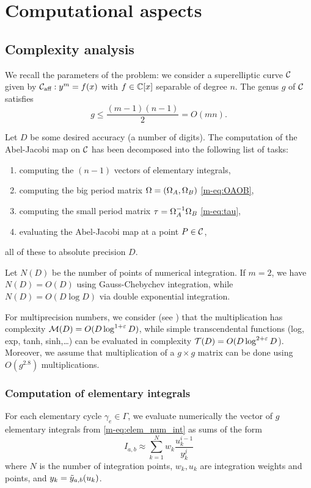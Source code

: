 \documentclass[main.tex]{subfiles}
\begin{document}
  \section{Computational aspects}\label{sec:comp_asp}

   \subsection{Complexity analysis}

   We recall the parameters of the problem: we consider a superelliptic curve $\mathcal{C}$ given by
   $\mathcal{C}_{\text{aff}}:y^m=f(x)$ with $f \in \mathbb{C}[x]$ separable of degree $n$. The genus $g$ of $\mathcal{C}$ satisfies
   $$g \leq \frac{(m-1)(n-1)}2=O(mn).$$

   Let $D$ be some desired accuracy (a number of digits). The computation of
   the Abel-Jacobi map on $\mathcal{C}$ has been decomposed into the
   following list of tasks:
   \begin{enumerate}
       \item computing the $(n-1)$ vectors of elementary integrals,
       \item computing the big period matrix $\Omega=(\Omega_A,\Omega_B)$ \eqref{m-eq:OAOB},
       \item computing the small period matrix $\tau = \Omega_A^{-1}\Omega_B$ \eqref{m-eq:tau},
       \item evaluating the Abel-Jacobi map at a point $P \in \mathcal{C}$,
   \end{enumerate}
   all of these to absolute precision $D$.

   Let $N(D)$ be the number of points of numerical integration.
   If $m=2$, we have
   $N(D)=O(D)$ using Gauss-Chebychev integration, while $N(D)=O(D\log D)$
   via double exponential integration.

   For multiprecision numbers, we consider (see \cite{BrentZimmermann}) that the multiplication has
   complexity $\mathcal M(D)=O(D \log^{1+\varepsilon}D)$,
   while simple transcendental functions (log, exp, tanh, sinh,\dots) can be evaluated
   in complexity $\mathcal T(D)=O(D\log^{2+\varepsilon} D$).
    Moreover, we assume that multiplication of a $g \times g$ matrix can
    be done using $O(g^{2.8})$ multiplications.

   \subsubsection{Computation of elementary integrals}
   \label{sec:comp_elem}

   For each elementary cycle $\gamma_e\in \Gamma$, we evaluate numerically the vector of $g$
   elementary integrals from \eqref{m-eq:elem_num_int} as sums of the form
   \begin{equation*}
       I_{a,b} \approx \sum_{k=1}^N w_k\frac{u_k^{i-1}}{y_k^j}
   \end{equation*}
   where $N$ is the number of integration points, $w_k,u_k$ are integration weights and points,
   and $y_k=\tilde{y}_{a,b}(u_k)$.
\end{document}
